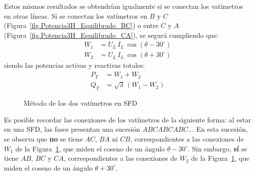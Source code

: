 \documentclass[11pt]{book} %
\begin{document}
Estos mismos resultados se obtendrían igualmente si se conectan los vatímetros en otras líneas. Si se conectan los vatímetros en $B$ y $C$ (Figura~\ref{fig.Potencia3H_Equilibrado_BC}) o entre $C$ y $A$ (Figura~\ref{fig.Potencia3H_Equilibrado_CA}), se segurá cumpliendo que: 
\begin{align*}
    W_1&=U_L\,I_L\,\cos(\theta-30^\circ) \\
    W_2&=U_L\,I_L\,\cos(\theta+30^\circ)
\end{align*}
siendo las potencias activas y reactivas totales: 
\begin{align*}
    P_T&=W_1 + W_2\\
    Q_T&=\sqrt{3}\,(W_1 - W_2)
\end{align*}
\begin{figure}[htbp]
    \centering{}\hfill
    \hfill
    \caption{Método de los dos vatímetros en SFD}
    \label{fig.potencia3H_equilibrado_SFD}
\end{figure}

\begin{remark}
    Es posible recordar las conexiones de los vatímetros de la siguiente forma: al estar en una SFD, las fases presentan una sucesión $ABCABCABC$... En esta sucesión, se observa que {\color{red}\textbf{no}} se tiene $AC$, $BA$ ni $CB$, correspondientes a las conexiones de $W_1$ de la Figura~\ref{fig.potencia3H_equilibrado_SFD}, que miden el coseno de un ángulo $\theta-30^\circ$. Sin embargo, {\color{red}\textbf{sí}} se tiene $AB$, $BC$ y $CA$, correspondientes a las conexiones de $W_2$ de la Figura~\ref{fig.potencia3H_equilibrado_SFD}, que miden el coseno de un ángulo $\theta+30^\circ$.
\end{remark}
  
\end{document}
